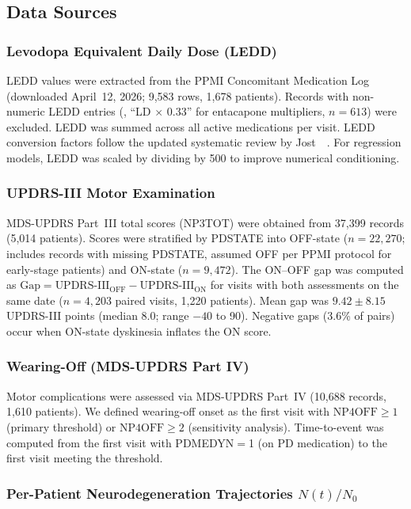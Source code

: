 \subsection{Data Sources}

\subsubsection{Levodopa Equivalent Daily Dose (LEDD)}

LEDD values were extracted from the PPMI Concomitant Medication Log
(downloaded April~12, 2026; 9,583 rows, 1,678 patients). Records with
non-numeric LEDD entries (\eg, ``LD $\times$ 0.33'' for entacapone
multipliers, $n{=}613$) were excluded. LEDD was summed across all active
medications per visit. LEDD conversion factors follow the updated
systematic review by Jost~\etal~\cite{jost2023}. For regression models,
LEDD was scaled by dividing by 500 to improve numerical conditioning.

\subsubsection{UPDRS-III Motor Examination}

MDS-UPDRS Part~III total scores (NP3TOT) were obtained from 37,399
records (5,014 patients). Scores were stratified by PDSTATE into OFF-state
($n{=}22{,}270$; includes records with missing PDSTATE, assumed OFF per
PPMI protocol for early-stage patients) and ON-state ($n{=}9{,}472$).
The ON--OFF gap was computed as $\text{Gap} = \text{UPDRS-III}_\text{OFF}
- \text{UPDRS-III}_\text{ON}$ for visits with both assessments on the same
date ($n{=}4{,}203$ paired visits, 1,220 patients). Mean gap was
$9.42 \pm 8.15$ UPDRS-III points (median 8.0; range $-40$ to 90).
Negative gaps (3.6\% of pairs) occur when ON-state dyskinesia inflates
the ON score.

\subsubsection{Wearing-Off (MDS-UPDRS Part IV)}

Motor complications were assessed via MDS-UPDRS Part~IV (10,688 records,
1,610 patients). We defined wearing-off onset as the first visit with
$\text{NP4OFF} \geq 1$ (primary threshold) or $\text{NP4OFF} \geq 2$
(sensitivity analysis). Time-to-event was computed from the first visit
with PDMEDYN$=$1 (on PD medication) to the first visit meeting the
threshold.

\subsubsection{Per-Patient Neurodegeneration Trajectories $N(t)/N_0$}

